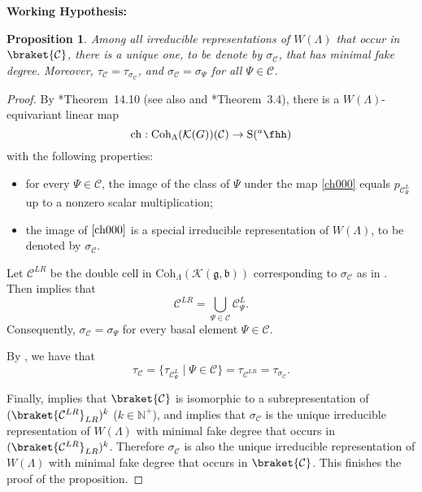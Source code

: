 \documentclass[12pt]{amsart}
\newcommand{\BN}{{\mathbb {N}}}
\newcommand{\CC}{{\mathcal {C}}}
\newcommand{\CK}{{\mathcal {K}}}
\DeclareMathOperator{\Ann}{Ann}
\newcommand{\g}{\mathfrak g}
\renewcommand{\b}{\mathfrak b}
\newcommand{\be}{\begin {equation}}
\newcommand{\ee}{\end {equation}}
\numberwithin{equation}{section}
\newtheorem{prop}[thm]{Proposition}
\theoremstyle{remark}
\def\hha{{}^a\fhh}
\def\Coh{\mathrm{Coh}}
\begin{document}
{\bf Working Hypothesis:}





 \begin{prop}\label{hcass22}
Among all irreducible representations of $W(\Lambda)$ that occur in
$\braket{\CC}$, there is a unique one,
to be denote by $\sigma_\CC$, that has minimal fake degree.
Moreover, $\tau_\CC=\tau_{\sigma_\CC}$, and   $\sigma_\CC = \sigma_{\Psi}$ for all  $\Psi\in  \CC$.
\end{prop}
\begin{proof}

By \cite{V4}*{Theorem~14.10} (see also \cite{King} and \cite{Cas}*{Theorem~3.4}), there is a $W(\Lambda)$-equivariant linear map
 \be\label{ch000}
   \mathrm{ch}: \Coh_\Lambda(\CK(G))(\CC)\rightarrow \mathrm S(\hha)
 \ee
with the following properties:
\begin{itemize}
    \item for every  $\Psi\in \CC$, the image of the class of $\Psi$ under the map \eqref{ch000} equals $p_{\CC^L_\Psi}$ up to a nonzero scalar multiplication;
    \item the image of $\eqref{ch000}$ is a special irreducible representation of $W(\Lambda)$, to be denoted by $\sigma_\CC$.
\end{itemize}

Let $\CC^{LR}$ be the double cell in $\Coh_\Lambda(\CK(\g,\b))$ corresponding to  $\sigma_\CC$ as in . Then  implies that
\[
  \CC^{LR}= \bigcup_{\Psi\in \CC} \CC^L_\Psi.
\]
Consequently, $\sigma_\CC = \sigma_{\Psi}$ for every basal element $\Psi\in  \CC$.

By , we have  that
\[
 \tau_\CC=\{\tau_{\CC_\Psi^L}\mid \Psi\in \CC\}=\tau_{\CC^{LR}}=\tau_{\sigma_\CC}.
\]

Finally,  implies that $\braket{\CC}$ is isomorphic to
a subrepresentation of $(\braket{\CC^{LR}}_{LR})^k$ ($k\in \BN^+$), and  implies that $\sigma_\CC$ is the unique  irreducible representation of $W(\Lambda)$ with minimal fake degree that occurs in $(\braket{\CC^{LR}}_{LR})^k$.
Therefore $\sigma_\CC$ is also the  unique  irreducible representation of $W(\Lambda)$ with minimal fake degree that occurs in $\braket{\CC}$. This finishes the proof of the proposition.
\end{proof}
\end{document}
